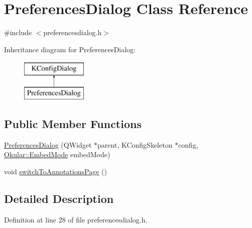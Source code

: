 \hypertarget{classPreferencesDialog}{\section{Preferences\+Dialog Class Reference}
\label{classPreferencesDialog}
}


{\ttfamily \#include $<$preferencesdialog.\+h$>$}

Inheritance diagram for Preferences\+Dialog\+:\begin{figure}[H]
\begin{center}
\leavevmode
\includegraphics[height=2.000000cm]{classPreferencesDialog}
\end{center}
\end{figure}
\subsection*{Public Member Functions}
\begin{DoxyCompactItemize}
\item 
\hyperlink{classPreferencesDialog_af70b16898a25b105688cda82ba814a50}{Preferences\+Dialog} (Q\+Widget $\ast$parent, K\+Config\+Skeleton $\ast$config, \hyperlink{namespaceOkular_adbe21e337d65d3f5f07a441180428ba8}{Okular\+::\+Embed\+Mode} embed\+Mode)
\item 
void \hyperlink{classPreferencesDialog_a31ca20e39c256b6351684dd8b4073ebe}{switch\+To\+Annotations\+Page} ()
\end{DoxyCompactItemize}


\subsection{Detailed Description}


Definition at line 28 of file preferencesdialog.\+h.



